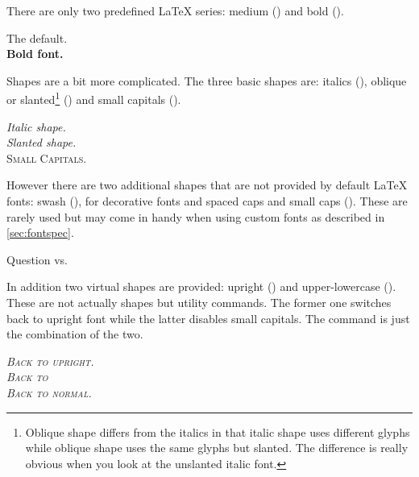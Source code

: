 There are only two predefined \LaTeX{} series: medium () and bold
().
\begin{example}
\textmd{The default.} \\
\textbf{Bold font.}
\end{example}

Shapes are a bit more complicated. The three basic shapes are: italics
(), oblique or slanted\footnote{Oblique shape differs from the
  italics in that italic shape uses different glyphs while oblique shape uses
  the same glyphs but slanted. The difference is really obvious
   when you look at the unslanted italic
  font.} () and small capitals ().
\begin{example}
\textit{Italic shape.} \\
\textsl{Slanted shape.} \\
\textsc{Small Capitals.}
\end{example}
However there are two additional shapes that are not provided by default
\LaTeX{} fonts: swash (), for decorative fonts and spaced caps and
small caps (). These are rarely used but may come in handy when
using custom fonts as described in \autoref{sec:fontspec}.
\begin{example}
\setmainfont{EB Garamond} %
Question vs. 
\end{example}
In addition two virtual shapes are provided: upright () and
upper-lowercase (). These are not actually shapes but utility
commands. The former one switches back to upright font while the latter
disables small capitals. The command  is just the combination
of the two.
\begin{example}
\textsl{\textsc{Back to
  \textup{upright.}}} \\
\textsl{\textsc{Back to
  }} \\
\textsl{\textsc{Back to
  \textnormal{normal.}}}
\end{example}

